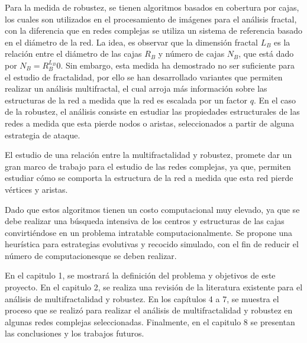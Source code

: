 Para la medida de robustez, se tienen algoritmos basados en cobertura por cajas, los cuales son utilizados en el procesamiento de imágenes para el análisis fractal, con la diferencia que en redes complejas se utiliza un sistema de referencia basado en el diámetro de la red. La idea, es observar que la dimensión fractal $L_B$ es la relación entre el diámetro de las cajas $R_B$ y número de cajas $N_B$, que está dado por $N_B=R_{B}^{L_B}0$. Sin embargo, esta medida ha demostrado no ser suficiente para el estudio de fractalidad, por ello se han desarrollado variantes que permiten realizar un análisis multifractal, el cual arroja más información sobre las estructuras de la red a medida que la red es escalada por un factor $q$. En el caso de la robustez, el análisis consiste en estudiar las propiedades estructurales de las redes a medida que esta pierde nodos o aristas, seleccionados a partir de alguna estrategia de ataque.

El estudio de una relación entre la multifractalidad y robustez, promete dar un gran marco de trabajo para el estudio de las redes complejas, ya que, permiten estudiar cómo se comporta la estructura de la red a medida que esta red pierde vértices y aristas.

Dado que estos algoritmos tienen un costo computacional muy elevado, ya que se debe realizar una búsqueda intensiva de los centros y estructuras de las cajas convirtiéndose en un problema intratable computacionalmente. Se propone una heurística para estrategias evolutivas y recocido simulado, con el fin de reducir el número de computacionesque se deben realizar.

En el capitulo 1, se mostrará la definición del problema y objetivos de este proyecto. En el capitulo 2, se realiza una revisión de la literatura existente para el análisis de multifractalidad y robustez. En los capítulos 4 a 7, se muestra el proceso que se realizó para realizar el análisis de multifractalidad y robustez en algunas redes complejas seleccionadas. Finalmente, en el capitulo 8 se presentan las conclusiones y los trabajos futuros.